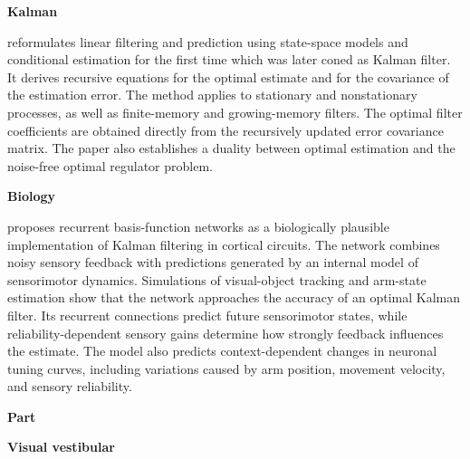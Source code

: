 \documentclass{book}
\providecommand{\ProjectDeepHeading}[2]{%
    \par\medskip\noindent\textbf{#2}\par\smallskip
}
\begin{document}
\ProjectDeepHeading{7}{Kalman}


\cite{kalman-1960-a-new-approach-to-linear-filtering-and-prediction-problems} reformulates linear filtering and prediction using state-space models and conditional estimation for the first time which was later coned as Kalman filter.
    It derives recursive equations for the optimal estimate and for the covariance of the estimation error.
    The method applies to stationary and nonstationary processes, as well as finite-memory and growing-memory filters.
    The optimal filter coefficients are obtained directly from the recursively updated error covariance matrix.
    The paper also establishes a duality between optimal estimation and the noise-free optimal regulator problem.

\ProjectDeepHeading{8}{Biology}


\cite{deneve-2007-optimal-sensorimotor-integration-in-recurrent-cortical-networks-a-neural-implementation-of-kalman-filters} proposes recurrent basis-function networks as a biologically plausible implementation of Kalman filtering in cortical circuits.
    The network combines noisy sensory feedback with predictions generated by an internal model of sensorimotor dynamics.
    Simulations of visual-object tracking and arm-state estimation show that the network approaches the accuracy of an optimal Kalman filter.
    Its recurrent connections predict future sensorimotor states, while reliability-dependent sensory gains determine how strongly feedback influences the estimate.
    The model also predicts context-dependent changes in neuronal tuning curves, including variations caused by arm position, movement velocity, and sensory reliability.

\ProjectDeepHeading{5}{Part}

\ProjectDeepHeading{6}{Visual vestibular}

\end{document}

